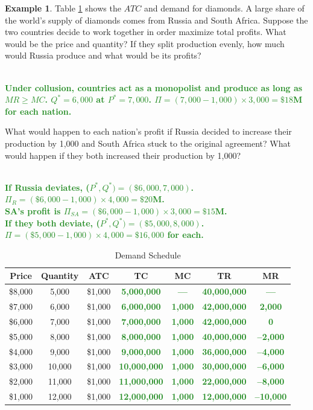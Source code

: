 \documentclass[11pt]{article}\usepackage[]{graphicx}\usepackage[]{color}
\theoremstyle{definition}
\newtheorem{exmp}{Example}[section]
\newcommand{\blank}[1]{}
\newcommand{\ddp}[1]{{\textbf{\textcolor{ForestGreen}{#1}}}}
\begin{document}
	
	\begin{exmp} Table \ref{diamonds} shows the $ATC$ and demand for diamonds. A large share of the world's supply of diamonds comes from Russia and South Africa. Suppose the two countries decide to work together in order maximize total profits. What would be the price and quantity? If they split production evenly, how much would Russia produce and what would be its profits?
		
		\ddp{\\ Under collusion, countries act as a monopolist and produce as long as $MR\ge MC$. $Q^* = 6,000$ at $P^* = 7,000$. $\Pi = (7,000 - 1,000) \times 3,000 = \$18$M for each nation.\\}
			\blank{}
			\blank{}
			\blank{}
			\blank{}
			\blank{}
			
	What would happen to each nation's profit if Russia decided to increase their production by 1,000 and South Africa stuck to the original agreement? What would happen if they both increased their production by 1,000?
		
		\ddp{\\ If Russia deviates, ($P^*,Q^*) = (\$6,000, 7,000)$. $\Pi_R = (\$6,000 - 1,000) \times 4,000 = \$20$M. \\
			SA's profit is $\Pi_{SA} = (\$6,000 - 1,000) \times 3,000 = \$15$M. \\ If they both deviate,  ($P^*,Q^*) = (\$5,000, 8,000)$. $\Pi = (\$5,000 - 1,000) \times 4,000 = \$16,000$ for each.}
	\end{exmp}
	
	\blank{}
	\blank{}
	\blank{}
	\blank{}
	\blank{}
	
	\begin{table}[H]
		\centering
		\caption{Demand Schedule}
		\label{diamonds}
		\begin{tabular}{  c| c | c | c| c| c| c}        
			
			Price & Quantity & ATC & TC & MC & TR &  MR  \\
			\hline
			\$8,000 & 5,000 & \$1,000 & \ddp{5,000,000} & \ddp{---} & \ddp{40,000,000} & \ddp{---}\\
			\$7,000 & 6,000 & \$1,000  & \ddp{6,000,000} & \ddp{1,000} & \ddp{42,000,000} & \ddp{2,000}\\
			\$6,000 & 7,000 & \$1,000  & \ddp{7,000,000} & \ddp{1,000} & \ddp{42,000,000} & \ddp{0}\\
			\$5,000 & 8,000 & \$1,000  & \ddp{8,000,000} & \ddp{1,000} & \ddp{40,000,000} & \ddp{--2,000}\\
			\$4,000 & 9,000 & \$1,000 & \ddp{9,000,000} & \ddp{1,000} & \ddp{36,000,000} & \ddp{--4,000}\\
			\$3,000 & 10,000 & \$1,000 & \ddp{10,000,000} & \ddp{1,000} & \ddp{30,000,000} & \ddp{--6,000}\\
			\$2,000 & 11,000 & \$1,000 & \ddp{11,000,000} & \ddp{1,000} & \ddp{22,000,000} & \ddp{--8,000}\\
			\$1,000 & 12,000 & \$1,000  & \ddp{12,000,000} & \ddp{1,000} & \ddp{12,000,000} & \ddp{--10,000}\\
			
		\end{tabular}
	\end{table} 
	
\end{document}
